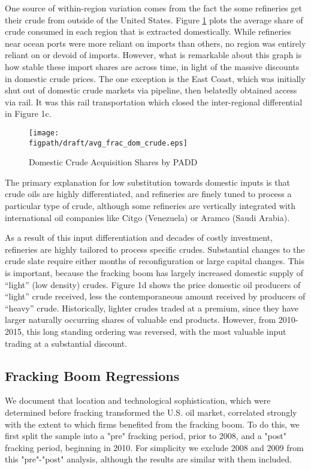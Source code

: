 \documentclass[12pt]{article}
\newcommand{\figpath}{../output/offline/figures}
\begin{document}
One source of within-region variation comes from the fact the some refineries get their crude from outside of the United States. Figure \ref{fig:PADD_dom_share} plots the average share of crude consumed in each region that is extracted domestically. While refineries near ocean ports were more reliant on imports than others, no region was entirely reliant on or devoid of imports. However, what is remarkable about this graph is how stable these import shares are across time, in light of the massive discounts in domestic crude prices. The one exception is the East Coast, which was initially shut out of domestic crude markets via pipeline, then belatedly obtained access via rail. It was this rail transportation which closed the inter-regional differential in Figure 1c.

\begin{figure}[]
  \centering{}\caption{Domestic Crude Acquisition Shares by PADD \label{fig:PADD_dom_share}}
  \texttt{[image: \\figpath/draft/avg\_frac\_dom\_crude.eps]}
\end{figure}

The primary explanation for low substitution towards domestic inputs is that crude oils are highly differentiated, and refineries are finely tuned to process a particular type of crude, although some refineries are vertically integrated with international oil companies like Citgo (Venezuela) or Aramco (Saudi Arabia).

As a result of this input differentiation and decades of costly investment, refineries are highly tailored to process specific crudes. Substantial changes to the crude slate require either months of reconfiguration or large capital changes. This is important, because the fracking boom has largely increased domestic supply of ``light'' (low density) crudes. Figure 1d shows the price domestic oil producers of ``light'' crude received, less the contemporaneous amount received by producers of ``heavy'' crude. Historically, lighter crudes traded at a premium, since they have larger naturally occurring shares of valuable end products. However, from 2010-2015, this long standing ordering was reversed, with the most valuable input trading at a substantial discount.

\subsection{Fracking Boom Regressions \label{sec:shaleRegression}}
We document that location and technological sophistication, which were determined before fracking transformed the U.S. oil market, correlated strongly with the extent to which firms benefited from the fracking boom. To do this, we first split the sample into a "pre" fracking period, prior to 2008, and a "post" fracking period, beginning in 2010.  For simplicity we exclude 2008 and 2009 from this "pre"-"post" analysis, although the results are similar with them included.
\end{document}
